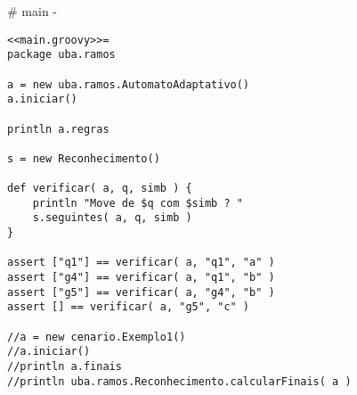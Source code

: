 # main {-}

\begin{lstlisting}[style=java]
<<main.groovy>>=
package uba.ramos

a = new uba.ramos.AutomatoAdaptativo()
a.iniciar()

println a.regras

s = new Reconhecimento()

def verificar( a, q, simb ) {
    println "Move de $q com $simb ? "
    s.seguintes( a, q, simb )
}

assert ["q1"] == verificar( a, "q1", "a" )
assert ["g4"] == verificar( a, "q1", "b" )
assert ["g5"] == verificar( a, "g4", "b" )
assert [] == verificar( a, "g5", "c" )

//a = new cenario.Exemplo1()
//a.iniciar()
//println a.finais
//println uba.ramos.Reconhecimento.calcularFinais( a )



\end{lstlisting}
